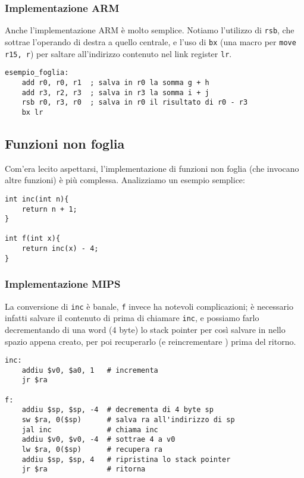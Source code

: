 \documentclass[class=book, crop=false, oneside]{standalone}
\begin{document}
\subsubsection{Implementazione ARM}
Anche l'implementazione ARM è molto semplice. Notiamo l'utilizzo di \texttt{rsb}, che sottrae l'operando di destra a quello centrale, e l'uso di \texttt{bx} (una macro per \texttt{move r15, r}) per saltare all'indirizzo contenuto nel link register \texttt{lr}.
\begin{verbatim}
esempio_foglia:
	add r0, r0, r1  ; salva in r0 la somma g + h
	add r3, r2, r3  ; salva in r3 la somma i + j
	rsb r0, r3, r0  ; salva in r0 il risultato di r0 - r3
	bx lr
\end{verbatim}

\subsection*{Funzioni non foglia}
Com'era lecito aspettarsi, l'implementazione di funzioni non foglia (che invocano altre funzioni) è più complessa. Analizziamo un esempio semplice:
\begin{verbatim}
int inc(int n){
	return n + 1;
}

int f(int x){
	return inc(x) - 4;
}
\end{verbatim}

\subsubsection{Implementazione MIPS}
La conversione di \texttt{inc} è banale, \texttt{f} invece ha notevoli complicazioni; è necessario infatti salvare il contenuto di  prima di chiamare \texttt{inc}, e possiamo farlo decrementando di una word (4 byte) lo stack pointer per così salvare  in  nello spazio appena creato, per poi recuperarlo (e reincrementare ) prima del ritorno.
\begin{verbatim}
inc:
	addiu $v0, $a0, 1   # incrementa
	jr $ra

f:
	addiu $sp, $sp, -4  # decrementa di 4 byte sp
	sw $ra, 0($sp)      # salva ra all'indirizzo di sp
	jal inc             # chiama inc
	addiu $v0, $v0, -4  # sottrae 4 a v0
	lw $ra, 0($sp)      # recupera ra
	addiu $sp, $sp, 4   # ripristina lo stack pointer
	jr $ra              # ritorna
\end{verbatim}
\end{document}
